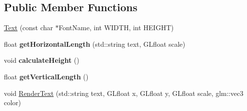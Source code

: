 \subsection*{Public Member Functions}
\begin{DoxyCompactItemize}
\item 
\hyperlink{class_text_a76a5d4d810534b5f8bc34ff45064f1f3}{Text} (const char $\ast$Font\+Name, int W\+I\+D\+TH, int H\+E\+I\+G\+HT)
\item 
float {\bfseries get\+Horizontal\+Length} (std\+::string text, G\+Lfloat scale)\hypertarget{class_text_a9aa7ce502af580459bd69158ece5fbe1}{}\label{class_text_a9aa7ce502af580459bd69158ece5fbe1}

\item 
void {\bfseries calculate\+Height} ()\hypertarget{class_text_a04f6769781cfbabba1451ce520ef89e6}{}\label{class_text_a04f6769781cfbabba1451ce520ef89e6}

\item 
float {\bfseries get\+Vertical\+Length} ()\hypertarget{class_text_aec8f18191f9b2090301e477a729c2f1e}{}\label{class_text_aec8f18191f9b2090301e477a729c2f1e}

\item 
void \hyperlink{class_text_abefa2ead7ccd585c07995bb5d7d52c97}{Render\+Text} (std\+::string text, G\+Lfloat x, G\+Lfloat y, G\+Lfloat scale, glm\+::vec3 color)
\end{DoxyCompactItemize}
